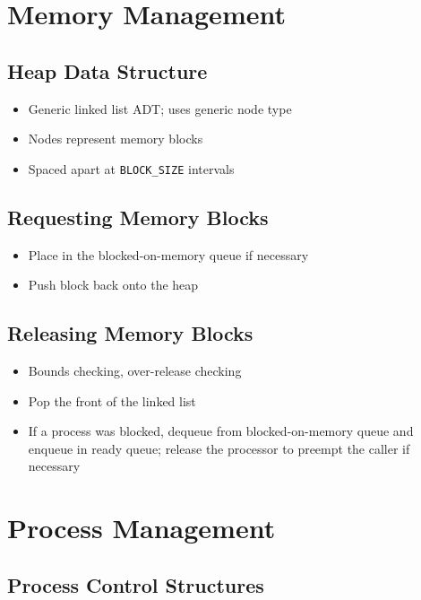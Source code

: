 \documentclass[12pt]{report}
\begin{document}
\section{Memory Management}

\subsection{Heap Data Structure}

\begin{itemize}
    \item Generic linked list ADT; uses generic node type
    \item Nodes represent memory blocks
    \item Spaced apart at \texttt{BLOCK_SIZE} intervals
\end{itemize}

\subsection{Requesting Memory Blocks}

\begin{itemize}
    \item Place in the blocked-on-memory queue if necessary
    \item Push block back onto the heap
\end{itemize}

\subsection{Releasing Memory Blocks}

\begin{itemize}
    \item Bounds checking, over-release checking
    \item Pop the front of the linked list
    \item If a process was blocked, dequeue from blocked-on-memory queue and enqueue in ready queue; release the processor to preempt the caller if necessary
\end{itemize}

\section{Process Management}

\subsection{Process Control Structures}
\end{document}

